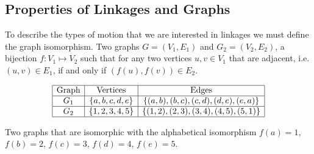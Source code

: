 \subsection{Properties of Linkages and Graphs}
To describe the types of motion that we are interested in linkages we must define the graph 
isomorphism.  Two graphs $G=(V_1,E_1)$ and $G_2 = (V_2,E_2) $, a bijection $f: V_1 \mapsto V_2$ 
such that for any two vertices $u,v \in V_1$ that are adjacent, i.e. $(u, v) \in E_1$, if and only 
if $(f(u),f(v)) \in E_2$. 
\begin{table}[!ht]
\begin{center}
$$\begin{array}{|c|c|c|}\hline
\text{Graph}&\text{Vertices}&\text{Edges}\\\hline
G_1&\left\lbrace a,b,c,d,e \right\rbrace & \left\lbrace (a,b),(b,c),(c,d),(d,e),(e,a) \right\rbrace 
\\\hline
G_2&\left\lbrace 1,2,3,4,5 \right\rbrace & \left\lbrace (1,2),(2,3),(3,4),(4,5),(5,1) \right\rbrace 
\\\hline
\end{array} $$
\caption{Two graphs that are isomorphic with the alphabetical isomorphism $f(a)=1$, $f(b)=2$, $f(c) 
= 3$, $f(d)=4$, $f(e)=5$.}
\end{center} 
\label{table:configuration-1}
\end{table} 
